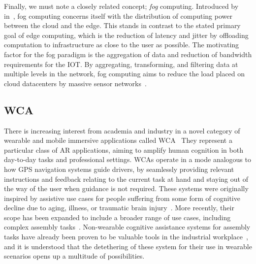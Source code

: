 Finally, we must note a closely related concept; \emph{fog} computing.
Introduced by \citeauthor{bonomi2012fog}~\cite{bonomi2012fog} in\ \citeyear{bonomi2012fog}, fog computing concerns itself with the distribution of computing power between the cloud and the edge.
This stands in contrast to the stated primary goal of edge computing, which is the reduction of latency and jitter by offloading computation to infrastructure as close to the user as possible.
The motivating factor for the fog paradigm is the aggregation of data and reduction of bandwidth requirements for the \gls{IOT}.
By aggregating, transforming, and filtering data at multiple levels in the network, fog computing aims to reduce the load placed on cloud datacenters by massive sensor networks~\cite{yi2015survey}.

\subsection{\acl{WCA}}\label{background:wca}

There is increasing interest from academia and industry in a novel category of wearable and mobile immersive applications called \gls{WCA}~\cite{ha2014towards,chen2018application,chen2015early,belletier2021wearable,chen2017empirical,wang2020scaling,chatzopoulos2017hyperion}
They represent a particular class of \gls{AR} applications, aiming to amplify human cognition in both day-to-day tasks and professional settings.
\glspl{WCA} operate in a mode analogous to how \gls{GPS} navigation systems guide drivers, by seamlessly providing relevant instructions and feedback relating to the current task at hand and staying out of the way of the user when guidance is not required.
These systems were originally inspired by assistive use cases for people suffering from some form of cognitive decline due to aging, illness, or traumatic brain injury~\cite{ha2014towards,satyanarayanan2019augmenting}.
More recently, their scope has been expanded to include a broader range of use cases, including complex assembly tasks~\cite{chen2017empirical,chen2018application,wang2020scaling,wang2019towards,ha2014towards}.
Non-wearable cognitive assistance systems for assembly tasks have already been proven to be valuable tools in the industrial workplace~\cite{funk2015cognitive,gorecky2011cognito}, and it is understood that the detethering of these system for their use in wearable scenarios opens up a multitude of possibilities.

